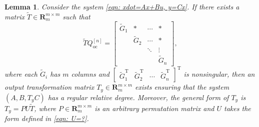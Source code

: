 \documentclass[sort&compress]{elsarticle}
\newtheorem{lemma}{Lemma}
\newcommand\Qoc{Q_\mathrm{oc}}
\newcommand\R{\mathbf R}
\newcommand\T{\mathrm T}
\begin{document}
\begin{lemma}\label{thm: solve Ty from an okay T}
Consider the system \eqref{eqn: xdot=Ax+Bu, y=Cx}.
If there exists a matrix $\tilde T \in \R_m^{m \times m}$ such that
\begin{equation*}
\tilde T \Qoc^{[n]} = \begin{bmatrix}
\tilde G_1 & * & \cdots & * \\
& \tilde G_2 & \cdots & * \\
& & \ddots & \vdots \\
& & & \tilde G_{n}
\end{bmatrix},
\end{equation*}
where each $\tilde G_i$ has $m$ columns and
$\begin{bmatrix} \tilde G_1^\T & \tilde G_2^\T & \cdots & \tilde G_n^\T \end{bmatrix}^\T$
is nonsingular,
then an output transformation matrix $T_y \in \R^{m \times m}_m$ exists
ensuring that the system $(A,B,T_yC)$ has a regular relative degree.
Moreover, the general form of $T_y$ is $T_y = PU\tilde T$,
where $P \in \R^{m \times m}_m$ is an arbitrary permutation matrix and
$U$ takes the form defined in \eqref{eqn: U=?}.
\end{lemma}
\end{document}
